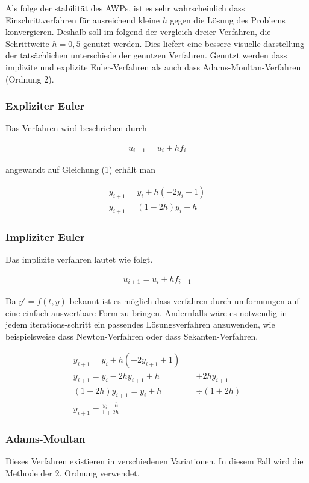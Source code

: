 \documentclass{article}
\newcommand\Section[1]{ %
  \addtocontents{toc}{\protect\setcounter{tocdepth}{0}}
  \subsubsection*{#1}
  \addtocontents{toc}{\protect\setcounter{tocdepth}{3}}}
\begin{document}
			Als folge der stabilität des AWPs, ist es sehr wahrscheinlich dass Einschrittverfahren für ausreichend kleine $h$ gegen die Lösung des Problems konvergieren. Deshalb soll im folgend der vergleich dreier Verfahren, die Schrittweite $h=0,5$ genutzt werden. Dies liefert eine bessere visuelle darstellung der tatsächlichen unterschiede der genutzen Verfahren. Genutzt werden dass implizite und explizite Euler-Verfahren als auch dass Adams-Moultan-Verfahren (Ordnung 2).
			
			\Section{Expliziter Euler}
			
				Das Verfahren wird beschrieben durch
				
				\begin{align*}
					u_{i+1} = u_{i} + hf_{i}
				\end{align*}
				
				angewandt auf Gleichung (1) erhält man
				
				\begin{align*}
					y_{i+1} = y_{i} + h(-2y_{i}+1) \\
					y_{i+1} = (1-2h)y_{i} + h
				\end{align*}
			
			\Section{Impliziter Euler}
			
				Das implizite verfahren lautet wie folgt.
				
				\begin{align*}
					u_{i+1} = u_{i} + hf_{i+1}
				\end{align*}
				
				Da $y' = f(t, y)$ bekannt ist es möglich dass verfahren durch umformungen auf eine einfach
				auswertbare Form zu bringen. Andernfalls wäre es notwendig in jedem iterations-schritt ein passendes
				Lösungsverfahren anzuwenden, wie beispielsweise dass Newton-Verfahren oder dass Sekanten-Verfahren.
				
				\begin{align*}
					y_{i+1} = y_{i} + h(-2y_{i+1}+1) \\
					y_{i+1} = y_{i} - 2hy_{i+1} + h  && | +2hy_{i+1} \\
					(1+2h)y_{i+1} = y_{i} + h && | \div(1+2h) \\
					y_{i+1} =  \frac{y_{i} + h}{1+2h}
				\end{align*} 
			
			\Section{Adams-Moultan}
			
				Dieses Verfahren existieren in verschiedenen Variationen. In diesem Fall wird die Methode der 2. Ordnung verwendet.
				
\end{document}
